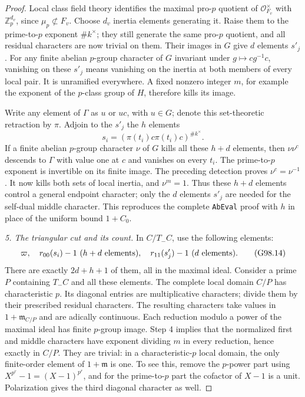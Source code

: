 \begin{proof}
Local class field theory identifies the maximal pro-$p$ quotient
of $\mathcal O_{F_v}^\times$ with $\mathbb Z_p^{d_v}$, since
$\mu_p\not\subset F_v$.  Choose $d_v$ inertia elements generating
it.  Raise them to the prime-to-$p$ exponent $\#k^\times$;
they still generate the same pro-$p$ quotient, and all residual
characters are now trivial on them.
Their images in $G$ give $d$ elements $s'_j$.
For any finite abelian $p$-group character of $G$ invariant under
$g\mapsto cg^{-1}c$, vanishing on these $s'_j$ means vanishing
on the inertia at both members of every local pair.
It is unramified everywhere.  A fixed nonzero integer $m$,
for example the exponent of the $p$-class group of $H$,
therefore kills its image.

Write any element of $\Gamma$ as $u$ or $uc$, with $u\in G$;
denote this set-theoretic retraction by $\pi$.
Adjoin to the $s'_j$ the $h$ elements
\[
 s_i=(\pi(t_i)c\pi(t_i)c)^{\#k^\times}.
 \tag{G98.13}
\]
If a finite abelian $p$-group character $\nu$ of $G$ kills
all these $h+d$ elements, then $\nu\nu^c$ descends to
$\Gamma$ with value one at $c$ and vanishes on every $t_i$.
The prime-to-$p$ exponent is invertible on its finite image.
The preceding detection proves $\nu^c=\nu^{-1}$.
It now kills both sets of local inertia, and $\nu^m=1$.
Thus these $h+d$ elements control a general endpoint character;
only the $d$ elements $s'_j$ are needed for the self-dual middle
character.  This reproduces the complete \texttt{AbEval} proof
with $h$ in place of the uniform bound $1+C_0$.

\emph{5. The triangular cut and its count.}
In $C/T_-C$, use the following elements:
\[
 \varpi,\quad r_{00}(s_i)-1\ (h+d\hbox{ elements}),\quad
 r_{11}(s'_j)-1\ (d\hbox{ elements}).
 \tag{G98.14}
\]
There are exactly $2d+h+1$ of them, all in the maximal ideal.
Consider a prime $P$ containing $T_-C$ and all these elements.
The complete local domain $C/P$ has characteristic $p$.
Its diagonal entries are multiplicative characters; divide them
by their prescribed residual characters.  The resulting characters
take values in $1+\mathfrak m_{C/P}$ and are adically continuous.
Each reduction modulo a power of the maximal ideal has finite
$p$-group image.  Step 4 implies that the normalized first and
middle characters have exponent dividing $m$ in every reduction,
hence exactly in $C/P$.  They are trivial: in a characteristic-$p$
local domain, the only finite-order element of $1+\mathfrak m$
is one.  To see this, remove the $p$-power part using
$X^{p^r}-1=(X-1)^{p^r}$, and for the prime-to-$p$ part the
cofactor of $X-1$ is a unit.  Polarization gives the third diagonal
character as well.


\end{proof}
